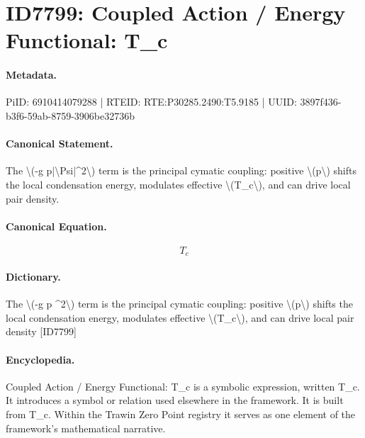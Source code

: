 \section*{ID7799: Coupled Action / Energy Functional: T\_c}
\paragraph{Metadata.}
PiID: 6910414079288 | RTEID: RTE:P30285.2490:T5.9185 | UUID: 3897f436-b3f6-59ab-8759-3906be32736b

\paragraph{Canonical Statement.}
The \textbackslash{}(-g p|\textbackslash{}Psi|\textasciicircum{}2\textbackslash{}) term is the principal cymatic coupling: positive \textbackslash{}(p\textbackslash{}) shifts the local condensation energy, modulates effective \textbackslash{}(T\_c\textbackslash{}), and can drive local pair density.

\paragraph{Canonical Equation.}
\[
T_c
\]

\paragraph{Dictionary.}
The \textbackslash{}(-g p \textasciicircum{}2\textbackslash{}) term is the principal cymatic coupling: positive \textbackslash{}(p\textbackslash{}) shifts the local condensation energy, modulates effective \textbackslash{}(T\_c\textbackslash{}), and can drive local pair density [ID7799]

\paragraph{Encyclopedia.}
Coupled Action / Energy Functional: T\_c is a symbolic expression, written T\_c. It introduces a symbol or relation used elsewhere in the framework. It is built from T\_c. Within the Trawin Zero Point registry it serves as one element of the framework's mathematical narrative.
